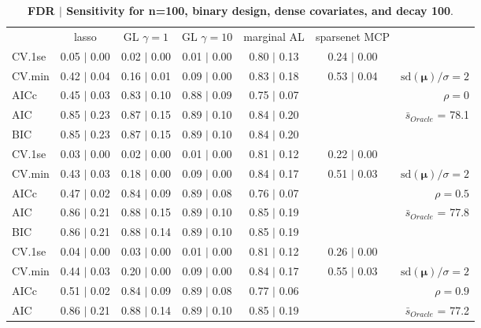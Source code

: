 \begin{table}\vspace{-.5cm}
\caption[l]{ {\it }
{ \bf FDR $\boldsymbol{\mid}$ Sensitivity for n=100, binary design, dense covariates, and  decay  100}.}
\vspace{-.5cm}
\footnotesize{}
\begin{center}
\begin{tabular}{l*{5}{c}|r}
 & lasso & GL $\gamma=1$ & GL $\gamma=10$ & marginal AL & sparsenet MCP  & \\
 \cline{1-7}
CV.1se & 0.05 $\mid$ 0.00 & 0.02 $\mid$ 0.00 & 0.01 $\mid$ 0.00 & 0.80 $\mid$ 0.13 & 0.24 $\mid$ 0.00 & \\
CV.min & 0.42 $\mid$ 0.04 & 0.16 $\mid$ 0.01 & 0.09 $\mid$ 0.00 & 0.83 $\mid$ 0.18 & 0.53 $\mid$ 0.04 &  $\mathrm{sd}(\mathbf{\mu})/\sigma=2$ \\
AICc & 0.45 $\mid$ 0.03 & 0.83 $\mid$ 0.10 & 0.88 $\mid$ 0.09 & 0.75 $\mid$ 0.07 & & $\rho=0$ \\
AIC & 0.85 $\mid$ 0.23 & 0.87 $\mid$ 0.15 & 0.89 $\mid$ 0.10 & 0.84 $\mid$ 0.20 & &  \multirow{2}{*}{$\bar{s}_{Oracle}$ = 78.1} \\
BIC & 0.85 $\mid$ 0.23 & 0.87 $\mid$ 0.15 & 0.89 $\mid$ 0.10 & 0.84 $\mid$ 0.20 & &  \\
 \hline 
CV.1se & 0.03 $\mid$ 0.00 & 0.02 $\mid$ 0.00 & 0.01 $\mid$ 0.00 & 0.81 $\mid$ 0.12 & 0.22 $\mid$ 0.00 & \\
CV.min & 0.43 $\mid$ 0.03 & 0.18 $\mid$ 0.00 & 0.09 $\mid$ 0.00 & 0.84 $\mid$ 0.17 & 0.51 $\mid$ 0.03 &  $\mathrm{sd}(\mathbf{\mu})/\sigma=2$ \\
AICc & 0.47 $\mid$ 0.02 & 0.84 $\mid$ 0.09 & 0.89 $\mid$ 0.08 & 0.76 $\mid$ 0.07 & & $\rho=0.5$ \\
AIC & 0.86 $\mid$ 0.21 & 0.88 $\mid$ 0.15 & 0.89 $\mid$ 0.10 & 0.85 $\mid$ 0.19 & &  \multirow{2}{*}{$\bar{s}_{Oracle}$ = 77.8} \\
BIC & 0.86 $\mid$ 0.21 & 0.88 $\mid$ 0.14 & 0.89 $\mid$ 0.10 & 0.85 $\mid$ 0.19 & &  \\
 \hline 
CV.1se & 0.04 $\mid$ 0.00 & 0.03 $\mid$ 0.00 & 0.01 $\mid$ 0.00 & 0.81 $\mid$ 0.12 & 0.26 $\mid$ 0.00 & \\
CV.min & 0.44 $\mid$ 0.03 & 0.20 $\mid$ 0.00 & 0.09 $\mid$ 0.00 & 0.84 $\mid$ 0.17 & 0.55 $\mid$ 0.03 &  $\mathrm{sd}(\mathbf{\mu})/\sigma=2$ \\
AICc & 0.51 $\mid$ 0.02 & 0.84 $\mid$ 0.09 & 0.89 $\mid$ 0.08 & 0.77 $\mid$ 0.06 & & $\rho=0.9$ \\
AIC & 0.86 $\mid$ 0.21 & 0.88 $\mid$ 0.14 & 0.89 $\mid$ 0.10 & 0.85 $\mid$ 0.19 & &  \multirow{2}{*}{$\bar{s}_{Oracle}$ = 77.2} \\

\end{tabular}
\end{center}
\end{table}
